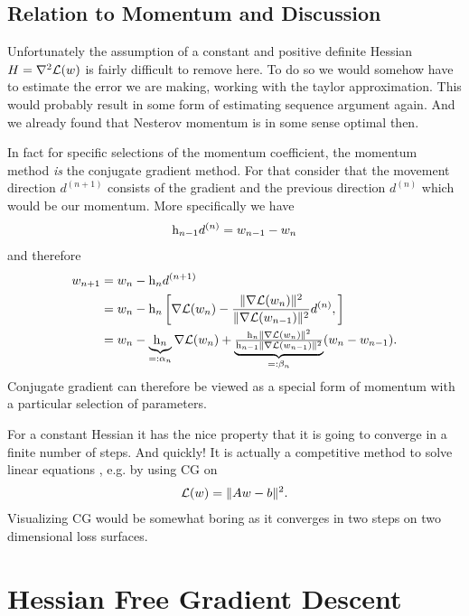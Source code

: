 \subsection{Relation to Momentum and Discussion}

Unfortunately the assumption of a constant and positive definite Hessian
\(H=\nabla^2\mathcal{L}(w)\) is fairly difficult to remove here. To do so
we would somehow have to estimate the error we are making, working with the taylor
approximation. This would probably result in some form of estimating sequence
argument again. And we already found that Nesterov momentum is in some sense
optimal then.

In fact for specific selections of the momentum coefficient, the momentum method
\emph{is} the conjugate gradient method. For that consider that the movement
direction \(d^{(n+1)}\) consists of the gradient and the previous direction
\(d^{(n)}\) which would be our momentum. More specifically we have
\begin{align*}
	\text{h}_{n-1}d^{(n)} = w_{n-1} - w_n
\end{align*}
and therefore
\begin{align*}
	w_{n+1}
	&= w_n - \text{h}_n d^{(n+1)}\\
	&= w_n - \text{h}_n \left[
		\nabla\mathcal{L}(w_n)
		- \frac{\|\nabla\mathcal{L}(w_n)\|^2}{\|\nabla\mathcal{L}(w_{n-1})\|^2}
		d^{(n)},
	\right]\\
	&= w_n - \underbrace{\text{h}_n}_{=:\alpha_n} \nabla\mathcal{L}(w_n)
		+ \underbrace{\tfrac{\text{h}_n\|\nabla\mathcal{L}(w_n)\|^2}{\text{h}_{n-1}\|\nabla\mathcal{L}(w_{n-1})\|^2}}_{=:\beta_n}
		(w_n-w_{n-1}).
\end{align*}
Conjugate gradient can therefore be viewed as a special form of momentum with
a particular selection of parameters.

For a constant Hessian it has the nice property that it is going to converge in
a finite number of steps. And quickly! It is actually a competitive method to
solve linear equations \parencite[Section 10]{shewchukIntroductionConjugateGradient1994},
e.g. by using CG on
\begin{align*}
	\mathcal{L}(w) = \|Aw - b\|^2.
\end{align*}
Visualizing CG would be somewhat boring as it converges in two steps on two
dimensional loss surfaces.

\section{Hessian Free Gradient Descent}
\textcite{martensDeepLearningHessianfree2010}

